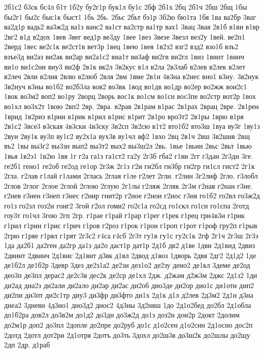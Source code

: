 {2б1с2
б3ск
бс4л
б1т
1б2у
бу2г1р
бук1л
бу1с
2бф
2б1х
2бц
2б1ч
2бш
2бщ
1бы
бы2г1
бы2с
быс1к
быст1
1бь
2бь.
2бьс
2бьт
бэ1р
3б2ю
бю1та
1бя
1ва
ва2бр
3ваг
ва2д1р
вадь2
ва3ж2д
ва1з
ванс2
ва1ст
ва2стр
ва1тр
вах1
3вац
3вая
2в1б
в1ви
в1вр
2вг2
в1д
в2дох
1вев
3вег
вед1р
ве3ду
1вее
1вез
3везе
3везл
вез2у
1вей.
ве2п1
2верд
1вес
ве2с1к
ве2ст1в
вет3р
1вец
1вею
1вея
1в2з2
взг2
взд2
взо1б
взъ2
взъе3д
ви2аз
ви2ак
ви2ар
ви2а1с2
виа1т
ви3аф
ви2гв
ви2гл
1виз
1винт
1винч
ви1о
ви1с2ни
виу3
ви2ф
2в1к
вк2л
3в2кус
в1л
в2ла
2в3лаб
в2лев
в2лек
в2лет
в2леч
2вли
в2лия
2влю
в2люб
2вля
2вм
1вме
2в1н
4в3на
в2нес
вно1
в3ну.
3в2нук
3в2нуч
в3ны
во1б2
во2б3ла
вов2
во3вк
1вод
во1дв
во1др
во2ер
во2жж
вои2с1
1вок
во3м2
воп2
во1ру
2ворц
2ворь
вос1к
во1см
во1сн
вос3пе
во2стр
вот2р
1вох
во1хл
во3х2т
1вою
2вп2
2вр.
2вра.
в2рав
2в1рам
в1рас
2в1рах
2врац
2вре.
2в1рен
1врид
1в2риз
в1рии
в1рик
в1рил
в1рис
в1рит
2в1ро
вро3т2
2в1ры
1врю
в1ря
2в1с2
3все3
в3ская
4в3ски
4в3ску
3в2сп
3в2сю
в1т2
вто1б2
вто3ш
1вуа
ву3г
1ву1з
2вуи
2ву1к
ву3п
ву1с2
ву2х1а
вух3в
ву1чл
вф2
1вхо
2вц
2в1ч
2вш
3в2шив
2вщ
въ2
1вы
вы3г2
вы3зн
вып2
вы3т2
вых2
вы3ш2л
2вь.
1вье
1вьин
2вьс
2вьт
1вью
1вья
1в2э1
1в2ю
1вя
1г
г2а
га1з
га1ст2
га2у
2г3б
гба2
г1ви
2гг
г3дан
2г3ди
3ге.
ге2б1
гено1
ге2об
ге2од
ге1ор
2г3ж
2г1з
г2и
ги2бл
ги3бр
ги2гр
ги1сл
гист2
2г1к
2гла.
г2лав
г1лай
г1лами
2глась
2глая
г1ле
г2лет
2гли.
г2лин
3г2лиф
2гло.
г3лобл
2глов
2глог
2глое
2глой
2глою
2глую
2г1лы
г2ляж
2гляк
2г3м
г2нав
г2нан
г3не.
г2нев
г3нен
г3неп
г3нес
г2нир
гнит2р
г2ное
г2нои
г2нос
г3ня
го1б2
го2вл
го3ж2д
го1з
го2зл
гоз2н
гоиг2
3гой
г2ол
гоми2
го2с1а
го2сд
го1скл
го1сн
го1спа
2готд
гоу3т
го1чл
3гою
2гп
2гр.
г1рае
г1рай
г1рар
г1рег
г1рек
г1рец
гри4в3н
г1рик
г1рил
г1рин
г1рис
г1рич
г1ров
г2роз
г1рок
г1рон
г1роп
г1рот
г1роф
гру2п
г1рыв
2грю
г1ряе
г1рял
г1рят
2г3с2
г4са
г4сб
2г3т
гу1в
гу1с
гу2с1к
2гф
2г1ч
2г3ш
2г3э
1да
да2б1
да2ген
да2гр
да1з
да2о
даст1р
дат1р
2д1б
дв2
д1ве
1дви
2д1вид
2двиз
2двинт
2двинч
2д1вис
2д1вит
д3вк
д1вл
2двод
д1воз
1дворь
2двя
2дг2
2д1д2
1де
де1б2л
де1б2р
3девр
3дез
де2з1а2
де2зи
дез1о2
де2зу
деио2
де1кл
3деме
де2од
део3п
де3пл
дерас2
де2с3в
дес2к
де2ср
де1хл
2дж.
д2жам
д2ж3м
2джс
2д1з2
1ди
ди2ад
диа2з
ди2али
ди2ало
ди2ар
ди2ас
ди2об
дио3де
ди2ор
дио1с
ди1оти
дип2
ди2пи
ди3пт
ди2с1тр
диу3
ди3фр
ди3фто
ди1х
2д1к
д1л
д2лев
2д3м2
2д1н
д3на
днеа2
3дневн
4д3но1
дно3д2
днос2
4д3ны
3д2няш
1до
2д1о2бед
до2бл
2д1обла
до1б2ра
дов2л
до3в2м
до1д2
до3дн
до3ж2д
до1з
доз2н
дои2р
2докт
2долим
до2м1р
доп2
до3пл
2допле
до2пре
до2руб
до1с
д1о2сен
д1о2син
2д1осно
дос2п
2дотд
2дотл
дот2ри
2д1отря
2дотъ
до3ть
3дохл
до2ш3в
до3ш2к
до2шлы
до2щу
2дп
2др.
д1раб
}

